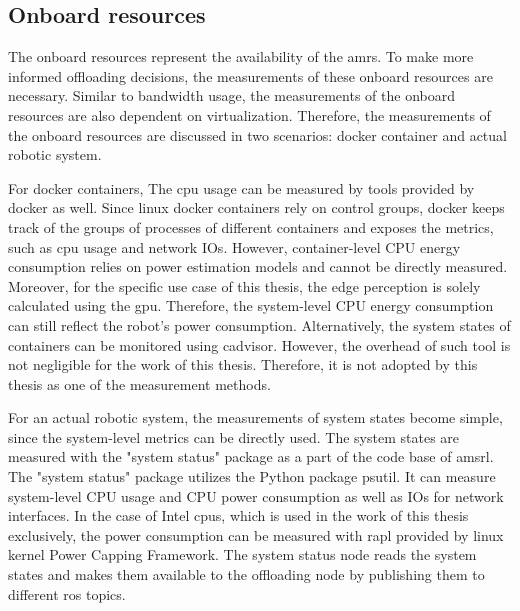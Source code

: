 \subsection{Onboard resources}

The onboard resources represent the availability of the \glspl{amr}. To make more informed offloading decisions, the measurements of these onboard resources are necessary. Similar to bandwidth usage, the measurements of the onboard resources are also dependent on virtualization. Therefore, the measurements of the onboard resources are discussed in two scenarios: \gls{docker} container and actual robotic system. 

For \gls{docker} containers, The \gls{cpu} usage can be measured by tools provided by \gls{docker} as well. Since \gls{linux} \gls{docker} containers rely on control groups, \gls{docker} keeps track of the groups of processes of different containers and exposes the metrics, such as \gls{cpu} usage and network IOs. However, container-level CPU energy consumption relies on power estimation models and cannot be directly measured. Moreover, for the specific use case of this thesis, the edge perception is solely calculated using the \gls{gpu}. Therefore, the system-level CPU energy consumption can still reflect the robot's power consumption. Alternatively, the system states of containers can be monitored using \gls{cadvisor}. However, the overhead of such tool is not negligible for the work of this thesis. Therefore, it is not adopted by this thesis as one of the measurement methods. 

For an actual robotic system, the measurements of system states become simple, since the system-level metrics can be directly used. The system states are measured with the "system status" package as a part of the code base of \gls{amsrl}. The "system status" package utilizes the Python package \gls{psutil}. It can measure system-level CPU usage and CPU power consumption as well as IOs for network interfaces. In the case of Intel \glspl{cpu}, which is used in the work of this thesis exclusively, the power consumption can be measured with \gls{rapl} provided by \gls{linux} kernel Power Capping Framework. The system status node reads the system states and makes them available to the offloading node by publishing them to different \gls{ros} topics. 

